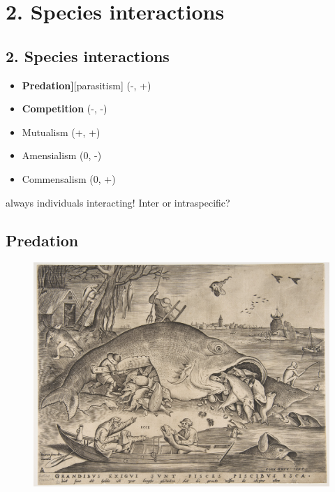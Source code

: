 \documentclass[
  letterpaper,
  DIV=11,
  numbers=noendperiod]{scrartcl}
\begin{document}
\hypertarget{species-interactions}{%
\section{2. Species interactions}\label{species-interactions}}

\hypertarget{species-interactions-1}{%
\subsection{2. Species interactions}\label{species-interactions-1}}

\begin{itemize}
\item
  \textbf{Predation{]}}{[}parasitism{]} (-, +)
\item
  \textbf{Competition} (-, -)
\item
  Mutualism (+, +)
\item
  Amensialism (0, -)
\item
  Commensalism (0, +)
\end{itemize}

always individuals interacting! Inter or intraspecific?

\hypertarget{predation}{%
\subsection{Predation}\label{predation}}

\begin{figure}

{\centering \includegraphics{images/big_fish.png}

}

\end{figure}
\end{document}
